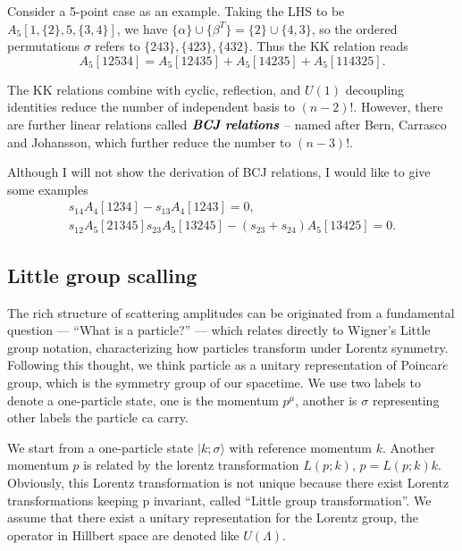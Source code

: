 \documentclass[12pt]{article}
\numberwithin{equation}{section}
\newcommand{\aket}[1]{|#1\rangle}
\begin{document}
Consider a 5-point case as an example. Taking the LHS to be $A_5[1,\{2\},5,\{3,4\}]$, we have $\{\alpha\}\cup \{\beta^T\}=\{2\}\cup \{4,3\}$, so the 
ordered permutations $\sigma$ refers to $\{243\},\{423\},\{432\}$. Thus the KK relation reads
\begin{equation}
    A_5[12534]=A_5[12435]+A_5[14235]+A_5[114325].
\end{equation}

The KK relations combine with cyclic, reflection, and $U(1)$ decoupling identities reduce the number of independent
basis to $(n-2)!$. However, there are further linear relations called $\textit{\textbf{BCJ relations}}$ -- named after Bern, Carrasco and Johansson, which further
reduce the number to $(n-3)!$. 

Although I will not show the derivation of BCJ relations, I would like to give some examples
\begin{gather}
    s_{14}A_4[1234]-s_{13}A_4[1243]=0,\\
    s_{12}A_5[21345]s_{23}A_5[13245]-(s_{23}+s_{24})A_5[13425]=0.
\end{gather}
\subsection{Little group scalling}
The rich structure of scattering amplitudes can be originated from a fundamental question — “What is a particle?” — which relates directly to Wigner’s Little group notation,
characterizing how particles transform under Lorentz symmetry. Following this thought, we think particle as a unitary representation of 
Poincar$\acute{e}$ group, which is the symmetry group of our spacetime. We use two labels to denote a one-particle state, one is the momentum $p^\mu$, another is $\sigma$ representing
other labels the particle ca carry. 

We start from a one-particle state $\aket{k;\sigma}$ with reference momentum $k$. Another momentum $p$ is related by the lorentz transformation $L(p;k)$, $p=L(p;k)k$. Obviously, this Lorentz transformation is
not unique because there exist Lorentz transformations keeping p invariant, called ``Little group transformation''.  We assume that there exist a 
unitary representation for the Lorentz group, the operator in Hillbert space are denoted like $U(\Lambda)$. 
\end{document}
